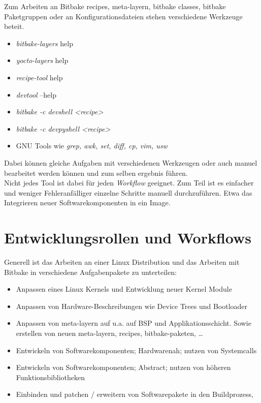     Zum Arbeiten an Bitbake recipes, meta-layern, bitbake classes,
        bitbake Paketgruppen oder an Konfigurationsdateien stehen verschiedene
Werkzeuge beteit.
        \begin{itemize}
            \item \textit{bitbake-layers} help
            \item \textit{yocto-layers } help
            \item \textit{recipe-tool} help
            \item \textit{devtool } --help
            \item \textit{bitbake -c devshell <recipe>}
            \item \textit{bitbake -c devpyshell <recipe>}
            \item GNU Tools wie \textit{grep, awk, set, diff, cp, vim, usw}
        \end{itemize}
         Dabei können gleiche Aufgaben mit verschiedenen Werkzeugen oder auch
         manuel bearbeitet werden können und zum selben ergebnis führen.\\

         Nicht jedes Tool ist dabei für jeden \textit{Workflow} geeignet. Zum
         Teil ist es einfacher und weniger Fehleranfälliger einzelne Schritte manuell
durchzuführen. Etwa das Integrieren neuer Software\-komponenten in ein Image.





\section{Entwicklungsrollen und Workflows}%
\label{sec:workflows}
Generell ist das Arbeiten an einer Linux Distribution und das Arbeiten mit
Bitbake in verschiedene Aufgabenpakete zu unterteilen:
\begin{itemize}
    \item Anpassen eines Linux Kernels und Entwicklung neuer Kernel Module
    \item Anpassen von Hardware-Beschreibungen wie Device Trees und Bootloader
    \item Anpassen von meta-layern auf u.a. auf BSP und Applikationsschicht.
        Sowie erstellen von neuen meta-layern, recipes, bitbake-paketen, \ldots
    \item Entwickeln von Softwarekomponenten; Hardwarenah; nutzen von
        Systemcalls
    \item Entwickeln von Softwarekomponenten; Abstract; nutzen von höheren
        Funktionsbibliotheken
    \item Einbinden und patchen / erweitern von Softwarepakete in den Buildprozess,
\end{itemize}

